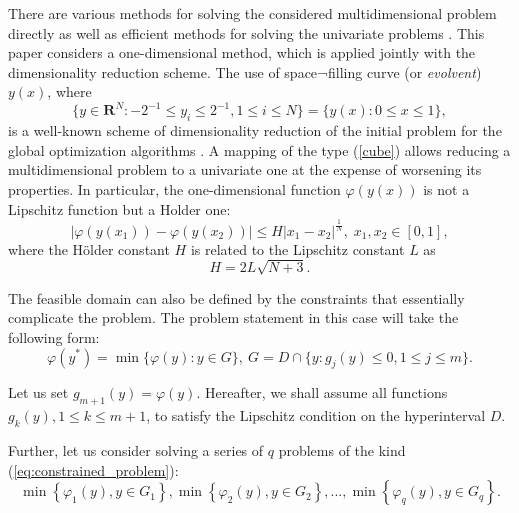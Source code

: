 \documentclass[runningheads]{llncs}
\begin{document}
There are various methods for solving the considered multidimensional problem directly
\cite{SergeyevKvasov2017, Jones2009} as well as efficient methods for solving the univariate problems \cite{Norkin1992, Strongin2000}.
This paper considers a one-dimensional method, which is applied jointly with
the dimensionality reduction scheme.
The use of space¬filling curve (or \textit{evolvent}) $y(x)$, where
\begin{equation}
\label{cube}
\lbrace y\in \mathbf{R}^N:-2^{-1}\leqslant y_i\leqslant 2^{-1},1\leqslant i\leqslant
N\rbrace=\{y(x):0\leqslant x\leqslant 1\},
\end{equation}
 is a well-known scheme of dimensionality reduction
 of the initial problem for the global optimization algorithms
\cite{Sergeyev2013}.
A mapping of the type (\ref{cube}) allows reducing a multidimensional problem to a univariate one at the expense of worsening its properties. In particular, the
one-dimensional function \(\varphi(y(x))\) is not a Lipschitz function but a Holder one:
\begin{displaymath}
\label{holder}
|\varphi(y(x_1))-\varphi(y(x_2))|\leqslant H{|x_1-x_2|}^{\frac{1}{N}}, \; x_1,x_2\in[0,1],
\end{displaymath}
where the H\"{o}lder constant \(H\) is related to the Lipschitz constant \(L\) as
\begin{displaymath}
  H=2L\sqrt{N+3}.
\end{displaymath}

The feasible domain can also be defined by the constraints that essentially complicate the problem.
The problem statement in this case will take the following form:
\begin{equation}
  \label{eq:constrained_problem}
  \varphi(y^*)=\min\{\varphi(y):y\in G\},\:G=D \cap \{y: g_j(y)\leqslant 0, 1\leqslant j\leqslant m\}.
\end{equation}

Let us set \(g_{m+1}(y)=\varphi(y)\). Hereafter, we shall assume all functions
\(g_k(y),1\leqslant k \leqslant m+1\),
to satisfy the Lipschitz condition on the hyperinterval \(D\).

Further, let us consider solving a series of \(q\) problems of the kind
(\ref{eq:constrained_problem}):
\begin{equation}
  \label{eq:many_problems}
  \min\left\{\varphi_1(y), y\in G_1 \right\}, \min\left\{\varphi_2(y), y\in G_2\right\},...,
\min\left\{\varphi_q(y), y\in G_q\right\}.
\end{equation}
\end{document}
